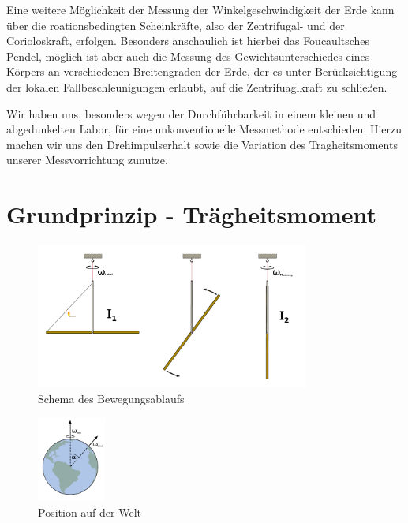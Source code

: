 \documentclass[11pt]{scrartcl}
\begin{document}
Eine weitere Möglichkeit der Messung der Winkelgeschwindigkeit der Erde kann über die roationsbedingten Scheinkräfte, also der Zentrifugal- und der Corioloskraft, erfolgen. Besonders anschaulich ist hierbei das Foucaultsches Pendel, möglich ist aber auch die Messung des Gewichtsunterschiedes eines Körpers an verschiedenen Breitengraden der Erde, der es unter Berücksichtigung der lokalen Fallbeschleunigungen erlaubt, auf die Zentrifuaglkraft zu schließen. 

Wir haben uns, besonders wegen der Durchführbarkeit in einem kleinen und abgedunkelten Labor, für eine unkonventionelle Messmethode entschieden. Hierzu machen wir uns den Drehimpulserhalt sowie die Variation des Tragheitsmoments unserer Messvorrichtung zunutze.

\section{Grundprinzip - Tr\"agheitsmoment}

\begin{figure}[ht]
\begin{center}
\includegraphics[width=0.8\textwidth]{images/prinzip.pdf}
\end{center}
\vspace{-1.5\baselineskip}
\caption{Schema des Bewegungsablaufs}
\label{prinzip}
\end{figure}

\begin{figure}[ht]
\begin{center}
\includegraphics[width=0.2\textwidth]{images/welt.pdf}
\end{center}
\vspace{-1.5\baselineskip}
\caption{Position auf der Welt}
\label{Welt}
\end{figure}
\end{document}
